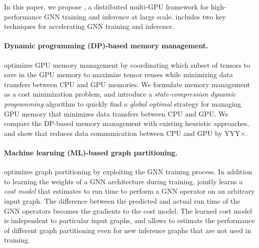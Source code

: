 
In this paper, we propose \Sys, a distributed multi-GPU framework for high-performance GNN training and inference at large scale. \Sys includes two key techniques for accelerating GNN training and inference.

\paragraph{Dynamic programming (DP)-based memory management.}
%
\Sys optimizes GPU memory management by coordinating which subset of tensors to save in the GPU memory to maximize tensor reuses while minimizing data transfers between CPU and GPU memories.
We formulate memory management as a cost minimization problem, and introduce a {\em state-compression dynamic programming} algorithm to quickly find a {\em global optimal} strategy for managing GPU memory that minimizes data transfers between CPU and GPU.
We compare the \Sys DP-based memory management with existing heuristic approaches, and show that \Sys reduces data communication between CPU and GPU by YYY$\times$.

\paragraph{Machine learning (ML)-based graph partitioning.}
\Sys optimizes graph partitioning by exploiting the GNN training process.
In addition to learning the weights of a GNN architecture during training, \Sys jointly learns a {\em cost model} that estimates to run time to perform a GNN operator on an arbitrary input graph.
The difference between the predicted and actual run time of the GNN operators becomes the gradients to the cost model.
The learned cost model is independent to particular input graphs, and allows \Sys to estimate the performance of different graph partitioning even for new inference graphs that are not used in training.

